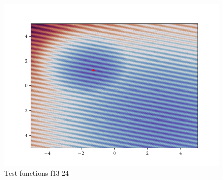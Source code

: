 \begin{figure}[h]
\begin{minipage}[b]{0.32\textwidth}
      \includegraphics[trim=2.5cm 1.3cm 2.5cm 1.3cm,clip,width=\textwidth]{Figures/coco/f24.png}
    \end{minipage}
    \caption{Test functions f13-24}
    \label{f13-24}
  \end{figure}
  